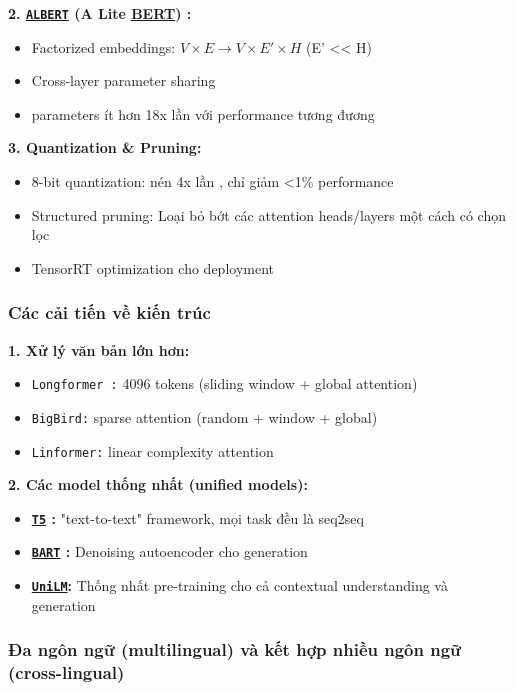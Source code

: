 \textbf{2. \hyperref[acro:albert]{\texttt{ALBERT}} (A Lite \hyperref[acro:bert]{\textbf{BERT}}) \cite{lan2019albert}:}
\begin{itemize}
    \item Factorized embeddings: $V \times E \rightarrow V \times E' \times H$ (E' << H)
    \item Cross-layer parameter sharing
    \item parameters ít hơn 18x lần với performance tương đương
\end{itemize}

\textbf{3. Quantization \& Pruning:}
\begin{itemize}
    \item 8-bit quantization: nén 4x lần , chỉ giảm <1\% performance 
    \item Structured pruning: Loại bỏ bớt các attention heads/layers một cách có chọn lọc
    \item TensorRT optimization cho deployment
\end{itemize}

\subsubsection{Các cải tiến về kiến trúc}

\textbf{1. Xử lý văn bản lớn hơn:}
\begin{itemize}
    \item \texttt{Longformer \cite{beltagy2020longformer}:} 4096 tokens (sliding window + global attention)
    \item \texttt{BigBird:} sparse attention (random + window + global)
    \item \texttt{Linformer:} linear complexity attention
\end{itemize}

\textbf{2. Các model thống nhất (unified models):}
\begin{itemize}
    \item \textbf{\hyperref[acro:t5]{\texttt{T5}} \cite{raffel2020exploring}:} "text-to-text" framework, mọi task đều là seq2seq
    \item \textbf{\hyperref[acro:bart]{\texttt{BART}} \cite{lewis2019bart}:} Denoising autoencoder cho generation
    \item \textbf{\hyperref[acro:unilm]{\texttt{UniLM}}:} Thống nhất pre-training cho cả contextual understanding và generation
\end{itemize}

\subsubsection{Đa ngôn ngữ (multilingual) và kết hợp nhiều ngôn ngữ (cross-lingual)}

